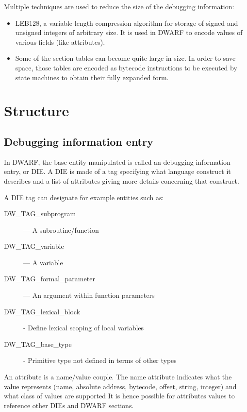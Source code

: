 Multiple techniques are used to reduce the size of the debugging information:

\begin{itemize}
    \item LEB128, a variable length compression algorithm for storage of
        signed and unsigned integers of arbitrary size.
        It is used in DWARF to encode values of various fields (like attributes).
    \item Some of the section tables can become quite large in size.
        In order to save space, those tables are encoded as bytecode instructions
        to be executed by state machines to obtain their fully expanded form.
\end{itemize}

\section{Structure}

\subsection{Debugging information entry}

In DWARF, the base entity manipulated is called an debugging information entry, or DIE.
A DIE is made of a tag specifying what language construct it describes and a list of attributes giving more details concerning that construct.

A DIE tag can designate for example entities such as:
\begin{description}
    \item[DW\_TAG\_subprogram] — A subroutine/function
    \item[DW\_TAG\_variable] — A variable
    \item[DW\_TAG\_formal\_parameter] — An argument within function parameters
    \item[DW\_TAG\_lexical\_block] - Define lexical scoping of local variables
    \item[DW\_TAG\_base\_type] - Primitive type not defined in terms of other
        types
\end{description}

An attribute is a name/value couple.
The name attribute indicates what the value represents (name, absolute address,
bytecode, offset, string, integer) and what class of values are supported
It is hence possible for attributes values to reference other DIEs and DWARF sections.

